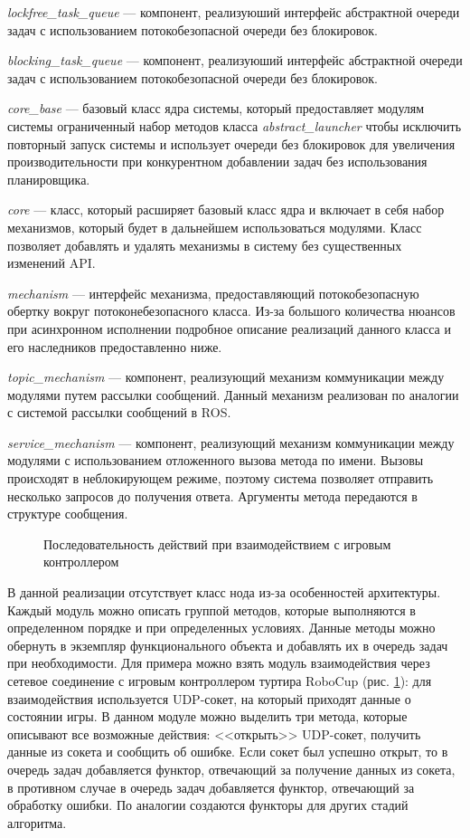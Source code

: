 \textit{lockfree\_task\_queue} --- компонент, реализуюший интерфейс абстрактной очереди задач с использованием потокобезопасной очереди без блокировок.

\textit{blocking\_task\_queue} --- компонент, реализуюший интерфейс абстрактной очереди задач с использованием потокобезопасной очереди без блокировок.

\textit{core\_base} --- базовый класс ядра системы, который предоставляет модулям системы ограниченный набор методов класса \textit{abstract\_launcher} чтобы исключить повторный запуск системы и использует очереди без блокировок для увеличения производительности при конкурентном добавлении задач без использования планировщика.

\textit{core} --- класс, который расширяет базовый класс ядра и включает в себя набор механизмов, который будет в дальнейшем использоваться модулями. Класс позволяет добавлять и удалять механизмы в систему без существенных изменений API.

\textit{mechanism} --- интерфейс механизма, предоставляющий потокобезопасную обертку вокруг потоконебезопасного класса. Из-за большого количества нюансов при асинхронном исполнении подробное описание реализаций данного класса и его наследников предоставленно ниже.

\textit{topic\_mechanism} --- компонент, реализующий механизм коммуникации между модулями путем рассылки сообщений. Данный механизм реализован по аналогии с системой рассылки сообщений в ROS.

\textit{service\_mechanism} --- компонент, реализующий механизм коммуникации между модулями с использованием отложенного вызова метода по имени. Вызовы происходят в неблокирующем режиме, поэтому система позволяет отправить несколько запросов до получения ответа. Аргументы метода передаются в структуре сообщения.

\begin{figure}[h]
    \centering{\texttt{[image: 2\_3\_2\_gc]}}
    \caption{Последовательность действий при взаимодействием с игровым контроллером}
    \label{im:2_3_2_gc}
\end{figure}

В данной реализации отсутствует класс нода из-за особенностей архитектуры. Каждый модуль можно описать группой методов, которые выполняются в определенном порядке и при определенных условиях. Данные методы можно обернуть в экземпляр функционального объекта и добавлять их в очередь задач при необходимости. Для примера можно взять модуль взаимодействия через сетевое соединение с игровым контроллером туртира RoboCup (рис. \ref{im:2_3_2_gc}): для взаимодействия используется UDP-сокет, на который приходят данные о состоянии игры. В данном модуле можно выделить три метода, которые описывают все возможные действия: <<открыть>> UDP-сокет, получить данные из сокета и сообщить об ошибке. Если сокет был успешно открыт, то в очередь задач добавляется функтор, отвечающий за получение данных из сокета, в противном случае в очередь задач добавляется функтор, отвечающий за обработку ошибки. По аналогии создаются функторы для других стадий алгоритма.

